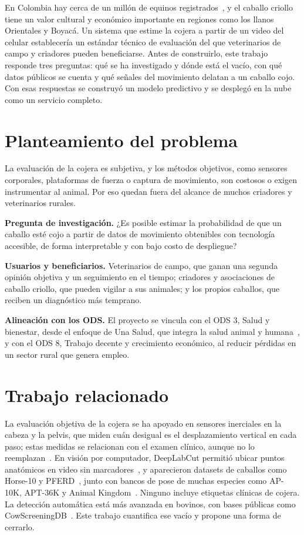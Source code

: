 \documentclass[conference,a4paper]{IEEEtran}
\begin{document}
En Colombia hay cerca de un millón de equinos registrados~\cite{agronegocios2025censo}, y el caballo criollo tiene un valor cultural y económico importante en regiones como los llanos Orientales y Boyacá. Un sistema que estime la cojera a partir de un video del celular establecería un estándar técnico de evaluación del que veterinarios de campo y criadores pueden beneficiarse. Antes de construirlo, este trabajo responde tres preguntas: qué se ha investigado y dónde está el vacío, con qué datos públicos se cuenta y qué señales del movimiento delatan a un caballo cojo. Con esas respuestas se construyó un modelo predictivo y se desplegó en la nube como un servicio completo.

\section{Planteamiento del problema}

La evaluación de la cojera es subjetiva, y los métodos objetivos, como sensores corporales, plataformas de fuerza o captura de movimiento, son costosos o exigen instrumentar al animal. Por eso quedan fuera del alcance de muchos criadores y veterinarios rurales.

\textbf{Pregunta de investigación.} ¿Es posible estimar la probabilidad de que un caballo esté cojo a partir de datos de movimiento obtenibles con tecnología accesible, de forma interpretable y con bajo costo de despliegue?

\textbf{Usuarios y beneficiarios.} Veterinarios de campo, que ganan una segunda opinión objetiva y un seguimiento en el tiempo; criadores y asociaciones de caballo criollo, que pueden vigilar a sus animales; y los propios caballos, que reciben un diagnóstico más temprano.

\textbf{Alineación con los ODS.} El proyecto se vincula con el ODS 3, Salud y bienestar, desde el enfoque de Una Salud, que integra la salud animal y humana~\cite{un2015}, y con el ODS 8, Trabajo decente y crecimiento económico, al reducir pérdidas en un sector rural que genera empleo.

\section{Trabajo relacionado}

La evaluación objetiva de la cojera se ha apoyado en sensores inerciales en la cabeza y la pelvis, que miden cuán desigual es el desplazamiento vertical en cada paso; estas medidas se relacionan con el examen clínico, aunque no lo reemplazan~\cite{keegan2013}. En visión por computador, DeepLabCut permitió ubicar puntos anatómicos en video sin marcadores~\cite{mathis2018}, y aparecieron datasets de caballos como Horse-10 y PFERD~\cite{mathis2021,li2024pferd}, junto con bancos de pose de muchas especies como AP-10K, APT-36K y Animal Kingdom~\cite{yu2021ap10k,yang2022apt36k,ng2022animalkingdom}. Ninguno incluye etiquetas clínicas de cojera. La detección automática está más avanzada en bovinos, con bases públicas como CowScreeningDB~\cite{ismail2024cow}. Este trabajo cuantifica ese vacío y propone una forma de cerrarlo.
\end{document}
